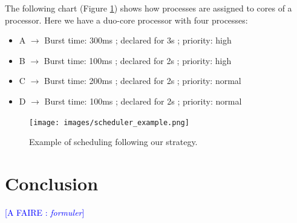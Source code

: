\documentclass[a4paper,11pt]{article}
\newcommand*{\todo}[1]{\textcolor{blue}{[A FAIRE : \emph{#1}]}}
\begin{document}
The following chart (Figure \ref{scheduling_example}) shows how processes are assigned to cores of a processor. Here we have a duo-core processor with four processes:

\begin{itemize}
\item A $\rightarrow$ Burst time: 300ms ; declared for 3s ; priority: high
\item B $\rightarrow$ Burst time: 100ms ; declared for 2s ; priority: high
\item C $\rightarrow$ Burst time: 200ms ; declared for 2s ; priority: normal
\item D $\rightarrow$ Burst time: 100ms ; declared for 2s ; priority: normal
\end{itemize}

\begin{center}
\begin{figure}[h]
\texttt{[image: images/scheduler\_example.png]}
\caption{Example of scheduling following our strategy.}
\label{scheduling_example}
\end{figure}
\end{center}

\newpage

\section{Conclusion}

\todo{formuler}

\newpage

\end{document}
